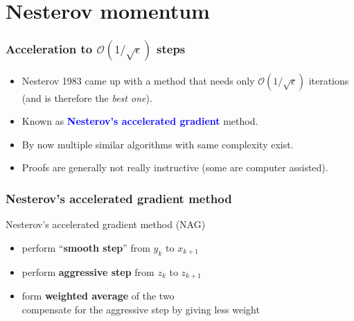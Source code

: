\documentclass[aspectration=169]{beamer}
\begin{document}
\section{Nesterov momentum}%
\label{sec:}

\begin{frame}
  \frametitle{Acceleration to $\mathcal{O}(1/\sqrt{\epsilon})$ steps}

  \begin{itemize}
    \item Nesterov 1983 came up with a method that needs only $\mathcal{O}(1/\sqrt{\epsilon})$ iterations (and is therefore the \textit{best one}).
    \item Known as \textcolor{blue}{\textbf{Nesterov's accelerated gradient}} method.
    \item By now multiple similar algorithms with same complexity exist.
    \item Proofs are generally not really instructive (some are computer assisted).
  \end{itemize}

\end{frame}


\begin{frame}
  \frametitle{Nesterov's accelerated gradient method}
  \begin{algorithm}[H]
    \caption{Nesterov's accelerated gradient method (NAG)}
    \begin{algorithmic}[1]
      \EndFor{}
    \end{algorithmic}
  \end{algorithm}


  \begin{itemize}
    \item perform ``\textbf{smooth step}'' from $y_k$ to $x_{k+1}$
    \item perform \textbf{aggressive step} from $z_k$ to $z_{k+1}$
    \item form \textbf{weighted average} of the two\\
          compensate for the aggressive step by giving less weight
  \end{itemize}

\end{frame}
\end{document}

